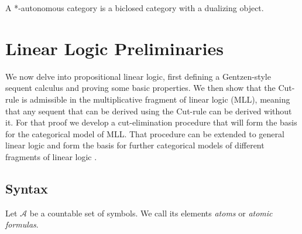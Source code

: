\documentclass[DIN, pagenumber=false, fontsize=11pt, parskip=half, colorinlistoftodos, svgnames]{scrartcl}
\newcommand{\urgentnote}[2][]{\todo[color=red, #1]{#2}}
\begin{document}
	\begin{definition}
		\label{def: autoCatBarrB}
		A *-autonomous category is a biclosed category with a dualizing object.
	\end{definition}
	
	\fi 



	
	\section{Linear Logic Preliminaries}
	
	
	We now delve into propositional linear logic, first defining a Gentzen-style sequent calculus and proving some basic properties.
	We then show that the Cut-rule is admissible in the multiplicative fragment of linear logic (MLL), meaning that any sequent that can be derived using the Cut-rule can be derived without it. 
	For that proof we develop a cut-elimination procedure that will form the basis for the categorical model of MLL.
	That procedure can be extended to general linear logic \cite{brauner} and form the basis for further categorical models of different fragments of linear logic \cite{mellies}.
	
	\subsection{Syntax}
	
	
	\begin{definition}
		Let $\mathcal{A}$ be a countable set of symbols. We call its elements \emph{atoms} or \emph{atomic formulas}. 
	\end{definition}
	
\end{document}
